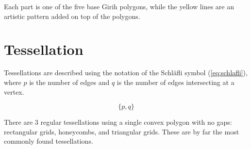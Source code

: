 \documentclass[12pt,letterpaper]{article}
\begin{document}
Each part is one of the five base Girih polygons, while the yellow lines are an artistic pattern added on top of the polygons.

\section{Tessellation}
Tessellations are described using the notation of the Schl\"afli symbol (\ref{eq:schlafli}), where $p$ is the number of edges and $q$ is the number of edges intersecting at a vertex.

\begin{equation}
    \label{eq:schlafli}
    \{p,q\}
\end{equation}

There are 3 regular tessellations using a single convex polygon with no gaps: rectangular grids, honeycombs, and triangular grids. These are by far the most commonly found tessellations.
\end{document}
